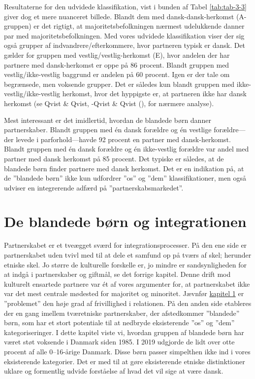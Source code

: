\documentclass[
]{book}
\begin{document}
Resultaterne for den udvidede klassifikation, vist i bunden af Tabel \ref{tab:tab-3-3} giver dog et mere nuanceret billede. Blandt dem med dansk-dansk-herkomst (A-gruppen) er det rigtigt, at majoritetsbefolkningen nærmest udelukkende danner par med majoritetsbefolkningen. Med vores udvidede klassifikation viser der sig også grupper af indvandrere/efterkommere, hvor partneren typisk er dansk. Det gælder for gruppen med vestlig/vestlig-herkomst (E), hvor andelen der har partnere med dansk-herkomst er oppe på 86 procent. Blandt gruppen med vestlig/ikke-vestlig baggrund er andelen på 60 procent. Igen er der tale om begrænsede, men voksende grupper. Det er således kun blandt gruppen med ikke-vestlig/ikke-vestlig herkomst, hvor det hyppigste er, at partneren ikke har dansk herkomst (se Qvist \& Qvist, -Qvist \& Qvist (), for nærmere analyse).

Mest interessant er det imidlertid, hvordan de blandede børn danner partnerskaber. Blandt gruppen med én dansk forældre og én vestlige forældre---der levede i parforhold---havde 92 procent en partner med dansk-herkomst. Blandt gruppen med én dansk forældre og én ikke-vestlig forældre var andel med partner med dansk herkomst på 85 procent. Det typiske er således, at de blandede børn finder partnere med dansk herkomst. Det er en indikation på, at de ''blandede børn'' ikke kun udfordrer ''os'' og ''dem'' klassifikationer, men også udviser en integrerende adfærd på ''partnerskabsmarkedet''.

\section{De blandede børn og integrationen}\label{de-blandede-buxf8rn-og-integrationen}

Partnerskabet er et tveægget sværd for integrationsprocesser. På den ene side er partnerskabet uden tvivl med til at dele et samfund op på tværs af skel; herunder etniske skel. Jo større de kulturelle forskelle er, jo mindre er sandsynligheden for at indgå i partnerskaber og giftmål, se det forrige kapitel. Denne drift mod kulturelt ensartede partnere var ét af vores argumenter for, at partnerskabet ikke var det mest centrale mødested for majoritet og minoritet. Jævnfør \hyperref[kap1]{kapitel 1} er ''problemet'' den høje grad af frivillighed i relationen. På den anden side etableres der en gang imellem tværetniske partnerskaber, der afstedkommer ''blandede'' børn, som har et stort potentiale til at nedbryde eksisterende ''os'' og ''dem'' kategoriseringer. I dette kapitel viste vi, hvordan gruppen af blandede børn har været støt voksende i Danmark siden 1985. I 2019 udgjorde de lidt over otte procent af alle 0--16-årige Danmark. Disse børn passer simpelthen ikke ind i vores eksisterende kategorier. Det er med til at gøre eksisterende etniske distinktioner uklare og formentlig udvide forståelse af hvad det vil sige at være dansk.
\end{document}
